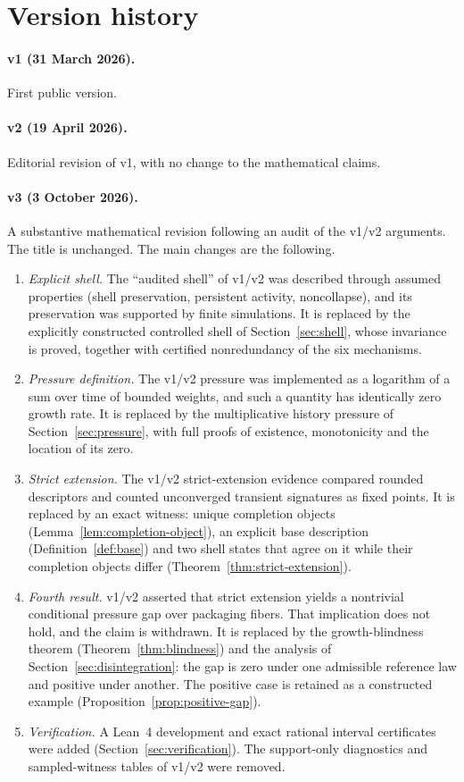 \section{Version history}\label{app:version-history}

\paragraph{v1 (31 March 2026).} First public version.

\paragraph{v2 (19 April 2026).} Editorial revision of v1, with no change to the mathematical claims.

\paragraph{v3 (3 October 2026).} A substantive mathematical revision following an audit of the v1/v2 arguments. The title is unchanged. The main changes are the following.
\begin{enumerate}
  \item \emph{Explicit shell.} The ``audited shell'' of v1/v2 was described through assumed properties (shell preservation, persistent activity, noncollapse), and its preservation was supported by finite simulations. It is replaced by the explicitly constructed controlled shell of Section~\ref{sec:shell}, whose invariance is proved, together with certified nonredundancy of the six mechanisms.
  \item \emph{Pressure definition.} The v1/v2 pressure was implemented as a logarithm of a sum over time of bounded weights, and such a quantity has identically zero growth rate. It is replaced by the multiplicative history pressure of Section~\ref{sec:pressure}, with full proofs of existence, monotonicity and the location of its zero.
  \item \emph{Strict extension.} The v1/v2 strict-extension evidence compared rounded descriptors and counted unconverged transient signatures as fixed points. It is replaced by an exact witness: unique completion objects (Lemma~\ref{lem:completion-object}), an explicit base description (Definition~\ref{def:base}) and two shell states that agree on it while their completion objects differ (Theorem~\ref{thm:strict-extension}).
  \item \emph{Fourth result.} v1/v2 asserted that strict extension yields a nontrivial conditional pressure gap over packaging fibers. That implication does not hold, and the claim is withdrawn. It is replaced by the growth-blindness theorem (Theorem~\ref{thm:blindness}) and the analysis of Section~\ref{sec:disintegration}: the gap is zero under one admissible reference law and positive under another. The positive case is retained as a constructed example (Proposition~\ref{prop:positive-gap}).
  \item \emph{Verification.} A Lean~4 development and exact rational interval certificates were added (Section~\ref{sec:verification}). The support-only diagnostics and sampled-witness tables of v1/v2 were removed.
\end{enumerate}
